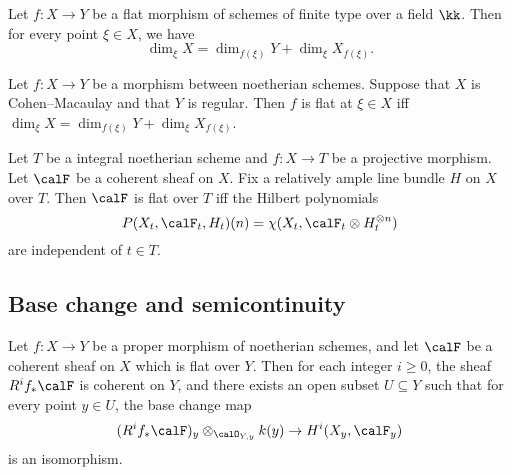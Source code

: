     \begin{proposition}\label{prop:flat_and_equi_dimensional_fiber}
        Let \(f:X \to Y\) be a flat morphism of schemes of finite type over a field \(\kk\).
        Then for every point \(\xi \in X\), we have
        \[ \dim_\xi X = \dim_{f(\xi)} Y + \dim_\xi X_{f(\xi)}. \]
    \end{proposition}

    \begin{theorem}\label{thm:Miracle_flatness}
        Let \(f:X\to Y\) be a morphism between noetherian schemes.
        Suppose that \(X\) is Cohen--Macaulay and that \(Y\) is regular.
        Then \(f\) is flat at \(\xi \in X\) iff \(\dim_\xi X = \dim_{f(\xi)} Y + \dim_\xi X_{f(\xi)}\).
    \end{theorem}

    \begin{theorem}\label{thm:flat_iff_has_the_same_Hilbert_polynomials}
        Let \(T\) be a integral noetherian scheme and \(f:X\to T\) be a projective morphism.
        Let \(\calF\) be a coherent sheaf on \(X\).
        Fix a relatively ample line bundle \(H\) on \(X\) over \(T\).
        Then \(\calF\) is flat over \(T\) iff the Hilbert polynomials 
        \[
            P(X_t,\calF_t,H_t)(n) = \chi(X_t,\calF_t \otimes H_t^{\otimes n})
        \]
        are independent of \(t \in T\).
    \end{theorem}



\subsection{Base change and semicontinuity}

    \begin{theorem}\label{thm:Grauert_theorem}
        Let \(f:X\to Y\) be a proper morphism of noetherian schemes, and let \(\calF\) be a coherent sheaf on \(X\) which is flat over \(Y\).
        Then for each integer \(i\geq 0\), the sheaf \(R^i f_* \calF\) is coherent on \(Y\), and there exists an open subset \(U \subseteq Y\) such that for every point \(y \in U\), the base change map
        \[
            (R^i f_* \calF)_y \otimes_{\calO_{Y,y}} k(y) \to H^i(X_y,\calF_y)
        \]
        is an isomorphism.
    \end{theorem}

